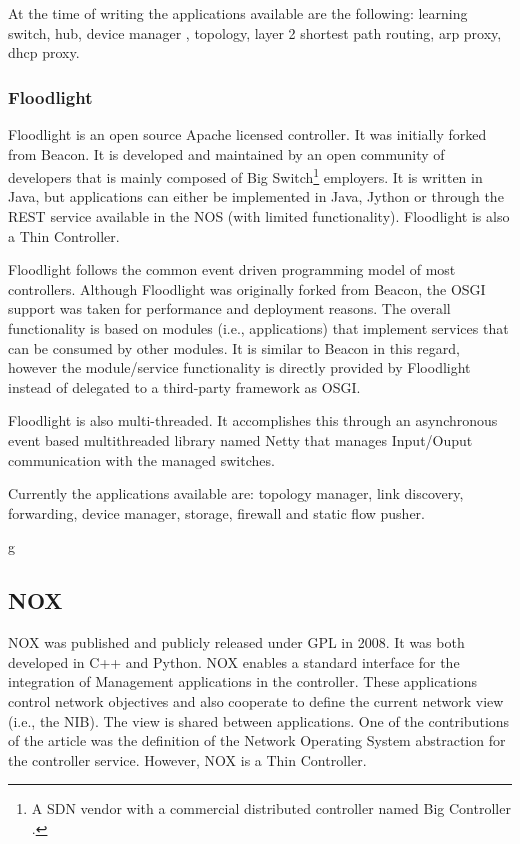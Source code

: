 \begin{itemize}
At the time of writing the applications available are the following: 
 learning switch, hub, device manager , topology, layer 2
shortest path routing, arp  proxy, dhcp proxy. 


\subsubsection{Floodlight}
Floodlight is an open source Apache licensed controller. It was
initially forked from Beacon. It  is developed and maintained by an open community of developers that is mainly composed of Big Switch\footnote{A SDN vendor with a commercial
distributed controller named Big Controller \cite{:vn}.} employers. It is written in Java, but applications can either be
implemented in Java, Jython or through the REST service
available in the NOS (with limited functionality). Floodlight is also a Thin Controller. 

Floodlight follows the common event driven
programming model of most  controllers. Although Floodlight was originally
forked from Beacon, the OSGI support was taken for performance and
deployment reasons. The overall functionality is based on modules
(i.e., applications) that implement services that can be consumed by
other modules. It is similar to Beacon in this regard, however the
module/service functionality is directly provided by Floodlight
instead of delegated to a third-party framework as OSGI. 

Floodlight is also multi-threaded. It accomplishes this through an
asynchronous event based multithreaded library named Netty \cite{netty} that manages Input/Ouput communication with the managed
switches. 

Currently the applications available are: topology manager,  link
discovery, forwarding, device manager, storage, firewall and
static flow pusher.  

g%
\subsection{NOX}
\label{sec:nox}
NOX \cite{Gude:2008jd}  was published and publicly released under
GPL in 2008. It was both developed in C++ and Python. NOX enables a standard interface for the integration of  Management applications 
in the controller. These applications control
network objectives and also cooperate to define the current
network view (i.e., the NIB). The view is shared between applications. One of the
contributions of the article was the definition of the Network
Operating System abstraction for the controller service. However, NOX
is a Thin Controller. 


\end{itemize}
